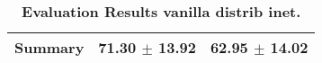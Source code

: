 \begin{table}[htb]
{\begin{tabular}{lll}
\midrule
\textbf{Summary                                  } &                  \phantom{0}71.30 $\pm$ 13.92 &                      \phantom{0}62.95 $\pm$ 14.02 \\
\bottomrule
\end{tabular}%
}
\caption{\textbf{Evaluation Results vanilla distrib inet.}}
\label{tab:eval-results}
\end{table}
